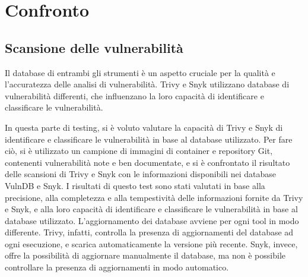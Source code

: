 \chapter{Confronto}
\section{Scansione delle vulnerabilità}
Il database di entrambi gli strumenti è un aspetto cruciale per la qualità e l'accuratezza delle analisi di vulnerabilità. Trivy e Snyk utilizzano database di vulnerabilità differenti, che influenzano la loro capacità di identificare e classificare le vulnerabilità.


In questa parte di testing, si è voluto valutare la capacità di Trivy e Snyk di identificare e classificare le vulnerabilità in base al database utilizzato. Per fare ciò, si è utilizzato un campione di immagini di container e repository Git, contenenti vulnerabilità note e ben documentate, e si è confrontato il risultato delle scansioni di Trivy e Snyk con le informazioni disponibili nei database VulnDB e Snyk. I risultati di questo test sono stati valutati in base alla precisione, alla completezza e alla tempestività delle informazioni fornite da Trivy e Snyk, e alla loro capacità di identificare e classificare le vulnerabilità in base al database utilizzato.
L'aggiornamento dei database avviene per ogni tool in modo differente. Trivy, infatti, controlla la presenza di aggiornamenti del database ad ogni esecuzione, e scarica automaticamente la versione più recente. Snyk, invece, offre la possibilità di aggiornare manualmente il database, ma non è possibile controllare la presenza di aggiornamenti in modo automatico.

